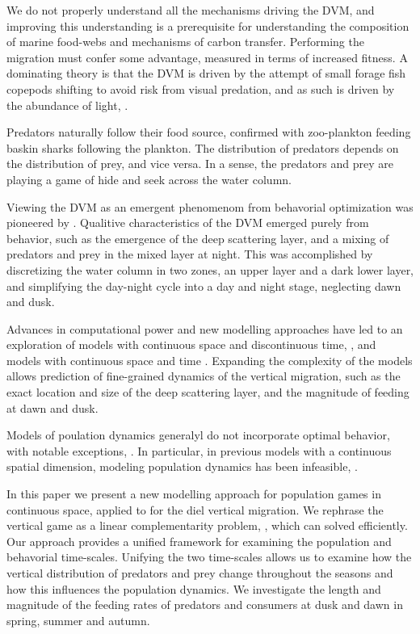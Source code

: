 We do not properly understand all the mechanisms driving the DVM, and improving this understanding is a prerequisite for understanding the composition of marine food-webs and mechanisms of carbon transfer. Performing the migration must confer some advantage, measured in terms of increased fitness. A dominating theory is that the DVM is driven by the attempt of small forage fish copepods shifting to avoid risk from visual predation, and as such is driven by the abundance of light, \citep{nilsson2003vertical}.

Predators naturally follow their food source, confirmed \citep{sims2005habitat} with zoo-plankton feeding baskin sharks following the plankton. The distribution of predators depends on the distribution of prey, and vice versa. In a sense, the predators and prey are playing a game of hide and seek across the water column.


Viewing the DVM as an emergent phenomenom from behavorial optimization was pioneered by \citep{iwasa1982vertical}. Qualitive characteristics of the DVM emerged purely from behavior, such as the emergence of the deep scattering layer, and a mixing of predators and prey in the mixed layer at night. This was accomplished by discretizing the water column in two zones, an upper layer and a dark lower layer, and simplifying the day-night cycle into a day and night stage, neglecting dawn and dusk.

Advances in computational power and new modelling approaches have led to an exploration of models with continuous space and discontinuous time, \citep{jerome}, and models with continuous space and time \citep{verticalmigration}.
Expanding the complexity of the models allows prediction of fine-grained dynamics of the vertical migration, such as the exact location and size of the deep scattering layer, and the magnitude of feeding at dawn and dusk.



Models of poulation dynamics generalyl do not incorporate optimal behavior, with notable exceptions, \citep{Krivan1998,genkai2007macrophyte}. In particular, in previous models with a continuous spatial dimension, modeling population dynamics has been infeasible, \citep{pinti2019trophic}.


In this paper we present a new modelling approach for population games in continuous space, applied to for the diel vertical migration. We rephrase the vertical game as a linear complementarity problem, \citep{miller1991copositive}, which can solved efficiently. Our approach provides a unified framework for examining the population and behavorial time-scales.  Unifying the two time-scales allows us to examine how the vertical distribution of predators and prey change throughout the seasons and how this influences the population dynamics. We investigate the length and magnitude of the feeding rates of predators and consumers at dusk and dawn in spring, summer and autumn.

